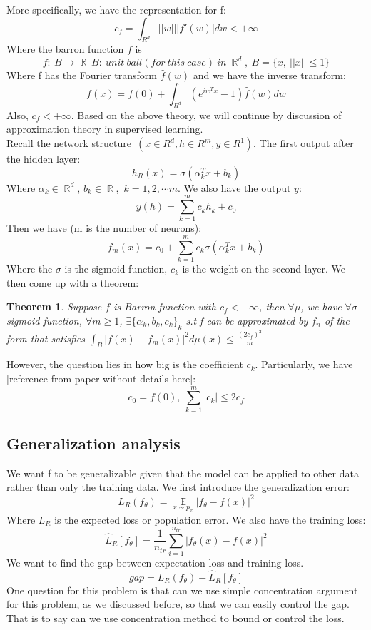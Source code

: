 \documentclass{article}
\DeclareMathOperator{\E}{\mathbb{E}}
\DeclareMathOperator{\R}{\mathbb{R}}
\newtheorem{theorem}{Theorem}[section]
\begin{document}
\noindent 
More specifically, we have the representation for f:
\[
c_f = \int_{R^d}||w|||f'(w)|dw < +{\infty}
\]
Where the barron function $f$ is 
\[
f:~B \rightarrow \R~ B:~unit~ball(for~this~case)~in~\R ^d,~B = \{ x,~||x||{\leq}1 \}
\]
Where f has the Fourier transform $\widehat{f}(w)$ and we have the inverse transform:
\[
f(x) = f(0) + \int_{R^d}(e^{iw^Tx} - 1) \widehat{f}(w)dw 
\] 
Also, $c_f<+\infty$.
Based on the above theory, we will continue by discussion of approximation theory in supervised learning.\\
\noindent
Recall the network structure~$(x{\in}R^d,h{\in}R^m,y{\in}R^1)$. The first output after the hidden layer:
\[
h_R(x) = \sigma(\alpha_k^Tx + b_k)
\]
Where $\alpha_k {\in} \R^d$, $b_k {\in} \R$,~$k=1,2,{\cdots}m$.
We also have the output $y$: 
\[
y(h) = \sum_{k=1}^m c_kh_k + c_0
\]
Then we have (m is the number of neurons):
\[
f_m(x) = c_0 + \sum_{k=1}^m c_k\sigma(\alpha_k^Tx+b_k)
\]
Where the $\sigma$ is the sigmoid function, $c_k$ is the weight on the second layer. We then come up with a theorem:
\begin{theorem}
Suppose $f$ is Barron function with $c_f<+\infty$, then $\forall \mu$, we have $\forall \sigma$ sigmoid function, $\forall m {\geq} 1$, $\exists \{ \alpha_k,b_k,c_k \}_k$ s.t f can be approximated by $f_n$ of the form that satisfies $\int_B |f(x) - f_m(x)|^2d \mu (x){\leq} \frac{(2c_f)^2}{m}$ 
\end{theorem}
However, the question lies in how big is the coefficient $c_k$. Particularly, we have [reference from paper without details here]:
\[
c_0 = f(0),~\sum_{k=1}^m |c_k| {\leq} 2c_f
\] 

\subsection{Generalization analysis} 
We want f to be generalizable given that the model can be applied to other data rather than only the training data. We first introduce the generalization error:
\[
L_R(f_{\theta}) = \E \limits_{x \sim p_x} |f_{\theta} - f(x)|^2
\]
Where $L_R$ is the expected loss or population error. 
\noindent
We also have the training loss:
\[
\widehat{L}_{R}[f_{\theta}] = \frac{1}{n_{tr}}\sum_{i=1}^{n_{tr}}|f_{\theta}(x) - f(x)|^2
\]
We want to find the gap between expectation loss and training loss.
\[
gap = L_R(f_{\theta}) - \widehat{L}_{R}[f_{\theta}]
\]
One question for this problem is that can we use simple concentration argument for this problem, as we discussed before, so that we can easily control the gap. That is to say can we use concentration method to bound or control the loss.\\
\end{document}
